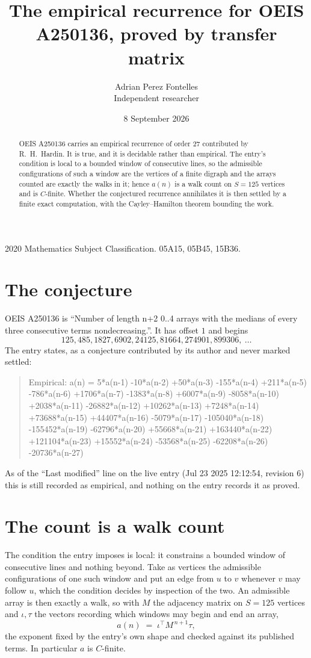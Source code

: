 \documentclass[11pt,a4paper]{article}
\title{The empirical recurrence for OEIS A250136, proved by transfer matrix}
\author{Adrian Perez Fontelles\\ \small Independent researcher}
\date{8 September 2026}
\theoremstyle{plain}
\theoremstyle{definition}
\begin{document}
\maketitle

\begin{abstract}
OEIS A250136 carries an empirical recurrence of order $27$ contributed by R.~H.~Hardin. It is
true, and it is decidable rather than empirical. The entry's condition is local to a bounded window of consecutive lines, so
the admissible configurations of such a window are the vertices of a finite digraph and the
arrays counted are exactly the walks in it; hence $a(n)$ is a walk count on $S=125$ vertices
and is $C$-finite. Whether the conjectured recurrence annihilates it is then settled by a
finite exact computation, with the Cayley--Hamilton theorem bounding the work.
\end{abstract}

\noindent\small 2020 Mathematics Subject Classification. 05A15, 05B45, 15B36.\normalsize

\section{The conjecture}

OEIS A250136 is ``Number of length n+2 0..4 arrays with the medians of every three consecutive terms nondecreasing.''. It has offset $1$ and begins
\[
125, 485, 1827, 6902, 24125, 81664, 274901, 899306,\ \dots
\]
The entry states, as a conjecture contributed by its author and never marked settled:
\begin{quote}
Empirical: a(n) = 5*a(n-1) -10*a(n-2) +50*a(n-3) -155*a(n-4) +211*a(n-5) -786*a(n-6) +1706*a(n-7) -1383*a(n-8) +6007*a(n-9) -8058*a(n-10) +2038*a(n-11) -26882*a(n-12) +10262*a(n-13) +7248*a(n-14) +73688*a(n-15) +44407*a(n-16) -5079*a(n-17) -105040*a(n-18) -155452*a(n-19) -62796*a(n-20) +55668*a(n-21) +163440*a(n-22) +121104*a(n-23) +15552*a(n-24) -53568*a(n-25) -62208*a(n-26) -20736*a(n-27)
\end{quote}
As of the ``Last modified'' line on the live entry (Jul 23 2025 12:12:54, revision 6) this is still
recorded as empirical, and nothing on the entry records it as proved.

\section{The count is a walk count}

The condition the entry imposes is local: it constrains a bounded window of consecutive lines and nothing beyond. Take as
vertices the admissible configurations of one such window and put an edge from $u$ to $v$
whenever $v$ may follow $u$, which the condition decides by inspection of the two. An
admissible array is then exactly a walk, so with $M$ the adjacency matrix on $S=125$ vertices
and $\iota,\tau$ the vectors recording which windows may begin and end an array,
\[
a(n)\;=\;\iota^{\!\top}M^{\,n+1}\tau ,
\]
the exponent fixed by the entry's own shape and checked against its published terms. In
particular $a$ is $C$-finite.
\end{document}
